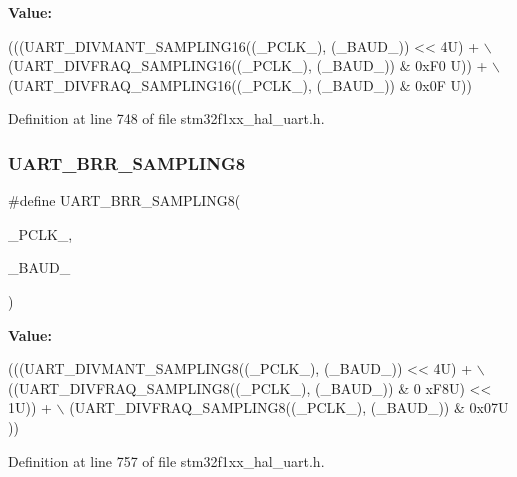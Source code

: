 {\bfseries Value\+:}
\begin{DoxyCode}
(((UART\_DIVMANT\_SAMPLING16((\_PCLK\_), (\_BAUD\_)) << 4U) + \(\backslash\)
                                                        (UART\_DIVFRAQ\_SAMPLING16((\_PCLK\_), (\_BAUD\_)) & 0xF0
      U)) + \(\backslash\)
                                                        (UART\_DIVFRAQ\_SAMPLING16((\_PCLK\_), (\_BAUD\_)) & 0x0F
      U))
\end{DoxyCode}


Definition at line 748 of file stm32f1xx\+\_\+hal\+\_\+uart.\+h.

\mbox{\label{group___u_a_r_t___private___macros_gae36ed9e94681494a31a9d8a7bbcc1a2c}} 
\subsubsection{\texorpdfstring{U\+A\+R\+T\+\_\+\+B\+R\+R\+\_\+\+S\+A\+M\+P\+L\+I\+N\+G8}{UART\_BRR\_SAMPLING8}}
{\footnotesize\ttfamily \#define U\+A\+R\+T\+\_\+\+B\+R\+R\+\_\+\+S\+A\+M\+P\+L\+I\+N\+G8(\begin{DoxyParamCaption}\item[{}]{\+\_\+\+P\+C\+L\+K\+\_\+,  }\item[{}]{\+\_\+\+B\+A\+U\+D\+\_\+ }\end{DoxyParamCaption})}

{\bfseries Value\+:}
\begin{DoxyCode}
(((UART\_DIVMANT\_SAMPLING8((\_PCLK\_), (\_BAUD\_)) << 4U) + \(\backslash\)
                                                        ((UART\_DIVFRAQ\_SAMPLING8((\_PCLK\_), (\_BAUD\_)) & 0
      xF8U) << 1U)) + \(\backslash\)
                                                        (UART\_DIVFRAQ\_SAMPLING8((\_PCLK\_), (\_BAUD\_)) & 0x07U
      ))
\end{DoxyCode}


Definition at line 757 of file stm32f1xx\+\_\+hal\+\_\+uart.\+h.

